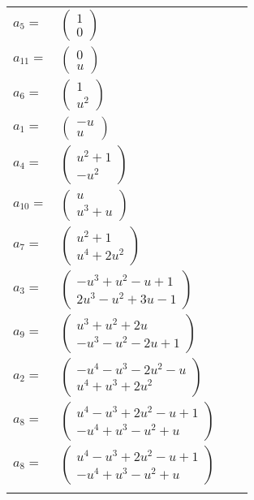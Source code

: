 \documentclass[1p]{elsarticle_modified}
\theoremstyle{definition}
\begin{document}
\begin{tabular}{m{7pt} m{180pt} m{7pt} m{180pt} }
\flushright $a_{5}=$&$\begin{pmatrix}1\\0\end{pmatrix}$ \\
\flushright $a_{11}=$&$\begin{pmatrix}0\\u\end{pmatrix}$ \\
\flushright $a_{6}=$&$\begin{pmatrix}1\\u^2\end{pmatrix}$ \\
\flushright $a_{1}=$&$\begin{pmatrix}- u\\u\end{pmatrix}$ \\
\flushright $a_{4}=$&$\begin{pmatrix}u^2+1\\- u^2\end{pmatrix}$ \\
\flushright $a_{10}=$&$\begin{pmatrix}u\\u^3+u\end{pmatrix}$ \\
\flushright $a_{7}=$&$\begin{pmatrix}u^2+1\\u^4+2 u^2\end{pmatrix}$ \\
\flushright $a_{3}=$&$\begin{pmatrix}- u^3+u^2- u+1\\2 u^3- u^2+3 u-1\end{pmatrix}$ \\
\flushright $a_{9}=$&$\begin{pmatrix}u^3+u^2+2 u\\- u^3- u^2-2 u+1\end{pmatrix}$ \\
\flushright $a_{2}=$&$\begin{pmatrix}- u^4- u^3-2 u^2- u\\u^4+u^3+2 u^2\end{pmatrix}$ \\
\flushright $a_{8}=$&$\begin{pmatrix}u^4- u^3+2 u^2- u+1\\- u^4+u^3- u^2+u\end{pmatrix}$\\ \flushright $a_{8}=$&$\begin{pmatrix}u^4- u^3+2 u^2- u+1\\- u^4+u^3- u^2+u\end{pmatrix}$\\&\end{tabular}
\end{document}
